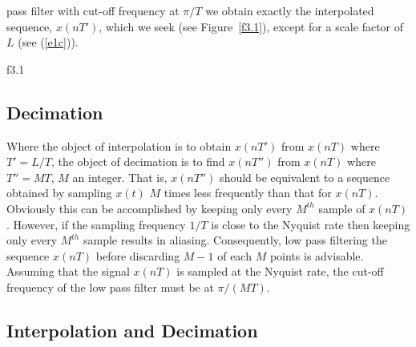 %
pass filter with cut-off frequency at $\pi/T$ we obtain
exactly the interpolated sequence, $x(nT')$, which we seek
(see Figure~\ref{f3.1}), except for a scale factor of $L$ (see (\ref{e1c})).
%

{f3.1}

%

\subsection{Decimation}

	Where the object of interpolation is to obtain $x(nT')$
from $x(nT)$ where $T'=L/T$, the object of decimation is
to find $x(nT'')$ from $x(nT)$ where $T''=MT$, $M$ an integer.
That is, $x(nT'')$ should be equivalent to a sequence obtained
by sampling $x(t)$ $M$ times less frequently than that for $x(nT)$.
Obviously this can be accomplished by keeping only every $M^{th}$
sample of $x(nT)$.  However, if the sampling frequency $1/T$ is
close to the Nyquist rate then keeping only every $M^{th}$
sample results in aliasing.  Consequently, low pass filtering
the sequence $x(nT)$ before discarding $M-1$ of each $M$ points is 
advisable.  Assuming that the signal $x(nT)$ is
sampled at the Nyquist rate, the cut-off frequency of the low pass filter
must be at $\pi/(MT)$.

\subsection{Interpolation and Decimation}

